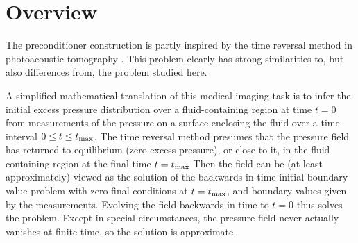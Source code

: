 \documentclass[12pt]{geophysics}
\newcommand{\bff}{\mathbf{f}}
\newcommand{\bu}{\mathbf{u}}
\begin{document}

\section{Overview}

The preconditioner construction is partly inspired by the time
reversal method in photoacoustic tomography
\cite[]{StefanovUhlmannIP:09,Hristova:09}. This problem
clearly has strong similarities to, but also differences from, the
problem studied here.

A simplified mathematical
translation of this medical imaging task is to infer the initial
excess pressure distribution over a fluid-containing region at time
$t=0$ from measurements of the pressure on a surface enclosing the
fluid over a time interval $0 \le t \le t_{\rm max}$. The time reversal method presumes that the
pressure field has returned to equilibrium (zero excess pressure), or
close to it, in the fluid-containing region at the
final time $t=t_{\rm max}$ Then the field can be (at least
approximately) viewed as the solution of the backwards-in-time initial boundary value
problem with zero final conditions at $t=t_{\rm max}$, and boundary
values given by the measurements. Evolving the field backwards in time
to $t=0$ thus solves the problem. Except in special
circumstances, the pressure field never actually vanishes at finite
time, so the solution is approximate.
\end{document}
